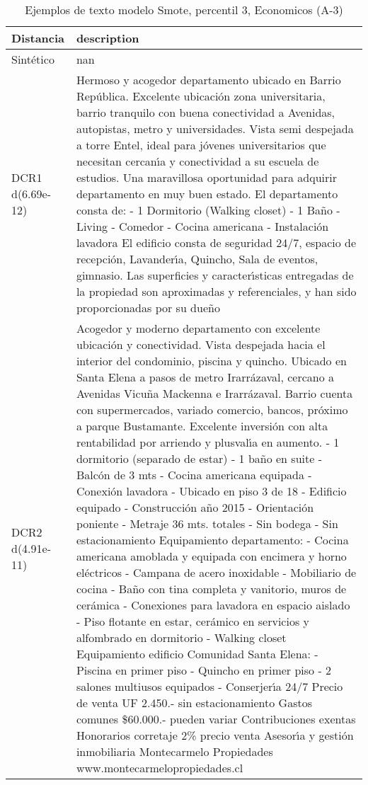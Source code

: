\begin{table}[H]
\centering
\fontsize{10}{14}\selectfont
\caption{Ejemplos de texto modelo Smote, percentil 3, Economicos (A-3)}
\label{table-example-economicos-a-3-smote-enc-3p-text}
\begin{tabular}{|l|m{35em}|}
\hline
\rowcolor[gray]{0.8}
Distancia & description \\
\hline Sintético & nan \\
\hline DCR1 d(6.69e-12) & Hermoso y acogedor departamento ubicado en Barrio Rep\'ublica. Excelente ubicaci\'on zona universitaria, barrio tranquilo con buena conectividad a Avenidas, autopistas, metro y universidades. Vista semi despejada a torre Entel, ideal para j\'ovenes universitarios que necesitan cercan{\'\i}a y conectividad a su escuela de estudios. Una maravillosa oportunidad para adquirir departamento en muy buen estado.  El departamento consta de:  - 1 Dormitorio (Walking closet) - 1 Ba\~no - Living - Comedor - Cocina americana  - Instalaci\'on lavadora  El edificio consta de seguridad 24/7, espacio de recepci\'on, Lavander{\'\i}a, Quincho, Sala de eventos, gimnasio.   Las superficies y caracter{\'\i}sticas entregadas de la propiedad son aproximadas y referenciales, y han sido proporcionadas por su due\~no \\
\hline DCR2 d(4.91e-11) & Acogedor y moderno departamento con excelente ubicaci\'on y conectividad. Vista despejada hacia el interior del condominio, piscina y quincho. Ubicado en Santa Elena a pasos de metro Irarr\'azaval, cercano a Avenidas Vicu\~na Mackenna e Irarr\'azaval. Barrio cuenta con supermercados, variado comercio, bancos, pr\'oximo a parque Bustamante. Excelente inversi\'on con alta rentabilidad por arriendo y plusval{\'\i}a en aumento.  - 1 dormitorio (separado de estar) - 1 ba\~no en suite - Balc\'on de 3 mts - Cocina americana equipada - Conexi\'on lavadora - Ubicado en piso 3 de 18  - Edificio equipado - Construcci\'on a\~no 2015 - Orientaci\'on poniente - Metraje 36 mts. totales - Sin bodega - Sin estacionamiento  Equipamiento departamento: - Cocina americana amoblada y equipada con encimera y horno el\'ectricos - Campana de acero inoxidable - Mobiliario de cocina - Ba\~no con tina completa y vanitorio, muros de cer\'amica - Conexiones para lavadora en espacio aislado - Piso flotante en estar, cer\'amico en servicios y alfombrado en dormitorio - Walking closet  Equipamiento edificio Comunidad Santa Elena: - Piscina en primer piso - Quincho en primer piso - 2 salones multiusos equipados - Conserjer{\'\i}a 24/7  Precio de venta UF 2.450.- sin estacionamiento Gastos comunes \$60.000.- pueden variar Contribuciones exentas Honorarios corretaje 2\% precio venta  Asesor{\'\i}a y gesti\'on inmobiliaria Montecarmelo Propiedades www.montecarmelopropiedades.cl \\
\hline
\end{tabular}
\end{table}
